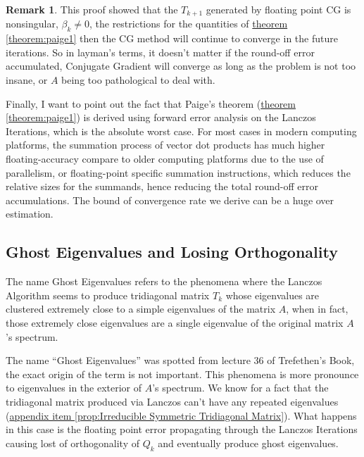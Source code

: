 \documentclass[]{article}
\theoremstyle{definition}
\newtheorem{remark}{Remark}[subsection]  %
\begin{document}
            \begin{remark}
                This proof showed that the $T_{k + 1}$ generated by floating point CG is nonsingular, $\beta_k \neq 0$, the restrictions for the quantities of \hyperref[theorem:paige1]{theorem \ref*{theorem:paige1}} then the CG method will continue to converge in the future iterations. So in layman's terms, it doesn't matter if the round-off error accumulated, Conjugate Gradient will converge as long as the problem is not too insane, or $A$ being too pathological to deal with. 
                \par
                Finally, I want to point out the fact that Paige's theorem (\hyperref[theorem:paige1]{theorem \ref*{theorem:paige1}}) is derived using forward error analysis on the Lanczos Iterations, which is the absolute worst case. For most cases in modern computing platforms, the summation process of vector dot products has much higher floating-accuracy compare to older computing platforms due to the use of parallelism, or floating-point specific summation instructions, which reduces the relative sizes for the summands, hence reducing the total round-off error accumulations. The bound of convergence rate we derive can be a huge over estimation. 
            \end{remark}

    \subsection{Ghost Eigenvalues and Losing Orthogonality}
        The name Ghost Eigenvalues refers to the phenomena where the Lanczos Algorithm seems to produce tridiagonal matrix $T_k$ whose eigenvalues are clustered extremely close to a simple eigenvalues of the matrix $A$, when in fact, those extremely close eigenvalues are a single eigenvalue of the original matrix $A$'s spectrum. 
        \par
        The name ``Ghost Eigenvalues'' was spotted from lecture 36 of Trefethen's Book\cite{book:trefethen}, the exact origin of the term is not important. This phenomena is more pronounce to eigenvalues in the exterior of $A$'s spectrum. We know for a fact that the tridiagonal matrix produced via Lanczos can't have any repeated eigenvalues (\hyperref[prop:Irreducible Symmetric Tridiagonal Matrix]{appendix item \ref*{prop:Irreducible Symmetric Tridiagonal Matrix}}). What happens in this case is the floating point error propagating through the Lanczos Iterations causing lost of orthogonality of $Q_k$ and eventually produce ghost eigenvalues. 
\end{document}
